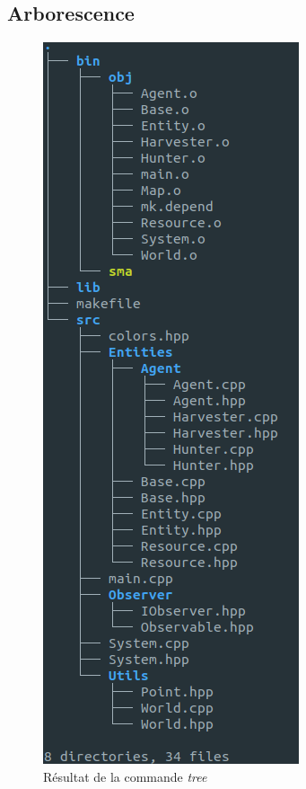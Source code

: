 \documentclass{article}
\begin{document}
\subsection{Arborescence}
\begin{figure}[!h]
  \centering
  \caption{Résultat de la commande \emph{tree}}
  \includegraphics[scale=0.5]{img/tree.png}
\end{figure}
\end{document}

